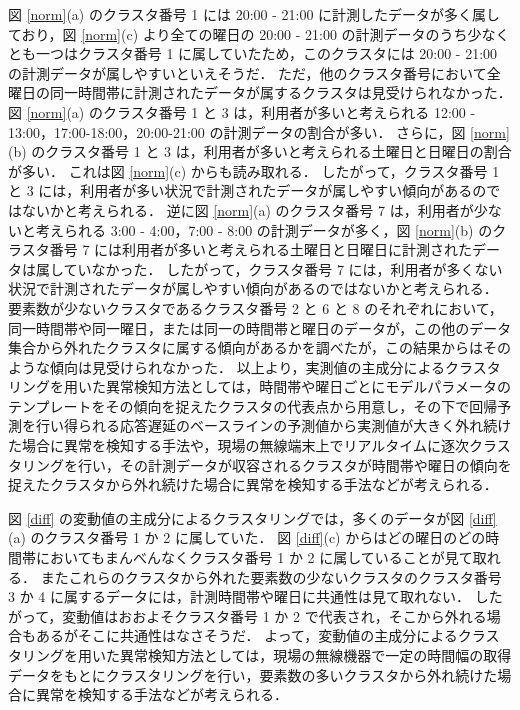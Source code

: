 \documentclass[technicalreport]{ieicej}
\begin{document}
図 \ref{norm}(a) のクラスタ番号 1 には 20:00 - 21:00 に計測したデータが多く属しており，図 \ref{norm}(c) より全ての曜日の 20:00 - 21:00 の計測データのうち少なくとも一つはクラスタ番号 1 に属していたため，このクラスタには 20:00 - 21:00 の計測データが属しやすいといえそうだ．
ただ，他のクラスタ番号において全曜日の同一時間帯に計測されたデータが属するクラスタは見受けられなかった．
図 \ref{norm}(a) のクラスタ番号 1 と 3 は，利用者が多いと考えられる 12:00 - 13:00，17:00-18:00，20:00-21:00 の計測データの割合が多い．
さらに，図 \ref{norm}(b) のクラスタ番号 1 と 3 は，利用者が多いと考えられる土曜日と日曜日の割合が多い．
これは図 \ref{norm}(c) からも読み取れる．
したがって，クラスタ番号 1 と 3 には，利用者が多い状況で計測されたデータが属しやすい傾向があるのではないかと考えられる．
逆に図 \ref{norm}(a) のクラスタ番号 7 は，利用者が少ないと考えられる 3:00 - 4:00，7:00 - 8:00 の計測データが多く，図 \ref{norm}(b) のクラスタ番号 7 には利用者が多いと考えられる土曜日と日曜日に計測されたデータは属していなかった．
したがって，クラスタ番号 7 には，利用者が多くない状況で計測されたデータが属しやすい傾向があるのではないかと考えられる．
要素数が少ないクラスタであるクラスタ番号 2 と 6 と 8 のそれぞれにおいて，同一時間帯や同一曜日，または同一の時間帯と曜日のデータが，この他のデータ集合から外れたクラスタに属する傾向があるかを調べたが，この結果からはそのような傾向は見受けられなかった．
以上より，実測値の主成分によるクラスタリングを用いた異常検知方法としては，時間帯や曜日ごとにモデルパラメータのテンプレートをその傾向を捉えたクラスタの代表点から用意し，その下で回帰予測を行い得られる応答遅延のベースラインの予測値から実測値が大きく外れ続けた場合に異常を検知する手法や，現場の無線端末上でリアルタイムに逐次クラスタリングを行い，その計測データが収容されるクラスタが時間帯や曜日の傾向を捉えたクラスタから外れ続けた場合に異常を検知する手法などが考えられる．

図 \ref{diff} の変動値の主成分によるクラスタリングでは，多くのデータが図 \ref{diff}(a) のクラスタ番号 1 か 2 に属していた．
図 \ref{diff}(c) からはどの曜日のどの時間帯においてもまんべんなくクラスタ番号 1 か 2 に属していることが見て取れる．
またこれらのクラスタから外れた要素数の少ないクラスタのクラスタ番号 3 か 4 に属するデータには，計測時間帯や曜日に共通性は見て取れない．
したがって，変動値はおおよそクラスタ番号 1 か 2 で代表され，そこから外れる場合もあるがそこに共通性はなさそうだ．
よって，変動値の主成分によるクラスタリングを用いた異常検知方法としては，現場の無線機器で一定の時間幅の取得データをもとにクラスタリングを行い，要素数の多いクラスタから外れ続けた場合に異常を検知する手法などが考えられる．
\end{document}
